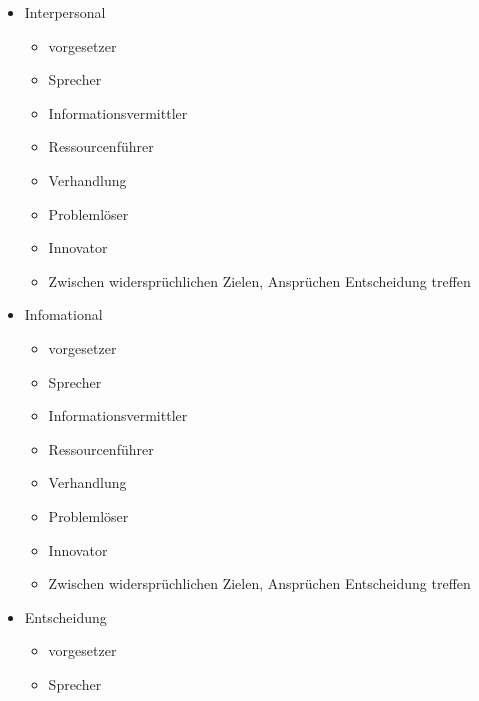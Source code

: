 \begin{itemize}
    \item Interpersonal
    \begin{itemize}
                \item vorgesetzer 

        \item Sprecher  

        \item Informationsvermittler 

        \item Ressourcenführer

        \item Verhandlung

        \item Problemlöser 

        \item Innovator

        \item Zwischen widersprüchlichen Zielen, Ansprüchen Entscheidung treffen

    \end{itemize}
    \item Infomational
    \begin{itemize}
                \item vorgesetzer 

        \item Sprecher  

        \item Informationsvermittler 

        \item Ressourcenführer

        \item Verhandlung

        \item Problemlöser 

        \item Innovator

        \item Zwischen widersprüchlichen Zielen, Ansprüchen Entscheidung treffen

    \end{itemize}
    \pagebreak
    \item Entscheidung
    \begin{itemize}
                \item vorgesetzer 

        \item Sprecher  


\end{itemize}
\end{itemize}
